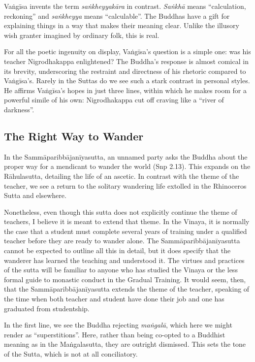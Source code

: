 \documentclass[12pt,openany]{book}%
\begin{document}
\textsanskrit{Vaṅgīsa} invents the term \textit{\textsanskrit{saṅkheyyakāra}} in contrast. \textit{\textsanskrit{Saṅkhā}} means “calculation, reckoning” and \textit{\textsanskrit{saṅkheyya}} means “calculable”. The Buddhas have a gift for explaining things in a way that makes their meaning clear. Unlike the illusory wish granter imagined by ordinary folk, this is real.

For all the poetic ingenuity on display, \textsanskrit{Vaṅgīsa}’s question is a simple one: was his teacher Nigrodhakappa enlightened? The Buddha’s response is almost comical in its brevity, underscoring the restraint and directness of his rhetoric compared to \textsanskrit{Vaṅgīsa}’s. Rarely in the Suttas do we see such a stark contrast in personal styles. He affirms \textsanskrit{Vaṅgīsa}’s hopes in just three lines, within which he makes room for a powerful simile of his own: Nigrodhakappa cut off craving like a “river of darkness”.

\subsection*{The Right Way to Wander}

In the \textsanskrit{Sammāparibbājanīyasutta}, an unnamed party asks the Buddha about the proper way for a mendicant to wander the world (Snp 2.13). This expands on the \textsanskrit{Rāhulasutta}, detailing the life of an ascetic. In contrast with the theme of the teacher, we see a return to the solitary wandering life extolled in the Rhinoceros Sutta and elsewhere.

Nonetheless, even though this sutta does not explicitly continue the theme of teachers, I believe it is meant to extend that theme. In the Vinaya, it is normally the case that a student must complete several years of training under a qualified teacher before they are ready to wander alone. The \textsanskrit{Sammāparibbājanīyasutta} cannot be expected to outline all this in detail, but it does specify that the wanderer has learned the teaching and understood it. The virtues and practices of the sutta will be familiar to anyone who has studied the Vinaya or the less formal guide to monastic conduct in the Gradual Training. It would seem, then, that the \textsanskrit{Sammāparibbājanīyasutta} extends the theme of the teacher, speaking of the time when both teacher and student have done their job and one has graduated from studentship.

In the first line, we see the Buddha rejecting \textit{\textsanskrit{maṅgalā}}, which here we might render as “superstitions”. Here, rather than being co-opted to a Buddhist meaning as in the \textsanskrit{Maṅgalasutta}, they are outright dismissed. This sets the tone of the Sutta, which is not at all conciliatory.
\end{document}

